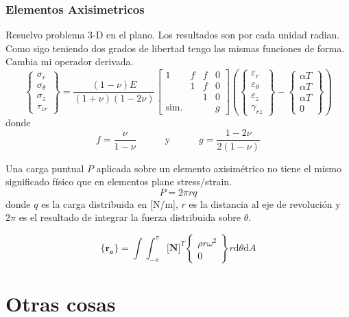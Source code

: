 \documentclass[11pt, a4paper,titlepage]{article}
\newcommand{\unspace}{\!\!\!\!\!\!\!\!\!\!\!\!\!\!\!\!\!\!\!\!}
\newcommand{\di}{\textrm{d}}
\newcommand{\Mme}[1]{\boldsymbol{[}\mathbf{#1} \boldsymbol{]}}
\newcommand{\Cme}[1]{\boldsymbol{\{ }\mathbf{#1} \boldsymbol{\}} }
\newcommand{\MN}{\Mme{N}}
\newcommand{\radial}{r}
\newcommand{\eff}{f}
\let\oldpart\part
\renewcommand{\part}[1]{\clearpage \oldpart{#1}}
\begin{document}
\section{Elementos Axisimetricos}
Resuelvo problema 3-D en el plano. Los resultados son por cada unidad radian. Como sigo teniendo dos grados de libertad tengo las mismas funciones de forma. Cambia mi operador derivada.
\[
\begin{Bmatrix}
    \sigma_\radial \\
    \sigma_\theta \\
    \sigma_z \\
    \tau_{z\radial}
\end{Bmatrix}
= \frac{(1-\nu)E}{(1+\nu)(1-2\nu)}
\begin{bmatrix}
   1 & \eff & \eff & 0 \\
    & 1 & \eff & 0 \\
    & & 1 & 0 \\
    \textrm{sim.}\unspace& & & g 
\end{bmatrix}
\left(
\begin{Bmatrix}
\varepsilon_\radial \\
\varepsilon_\theta \\
\varepsilon_z \\
\gamma_{\radial z}
\end{Bmatrix}
-
\begin{Bmatrix}
\alpha T\\
\alpha T \\
\alpha T \\
0
\end{Bmatrix}
\right)
\]
donde 
\[
f=\frac{\nu}{1-\nu}\qquad \quad \textrm{y}\quad \qquad g=\frac{1-2\nu}{2(1-\nu)}
\]

Una carga puntual $P$ aplicada sobre un elemento axisimétrico no tiene el mismo significado físico que en elementos plane stress/strain. 
\[
P=2\pi rq
\]
donde $q$ es la carga distribuida en [N/m], $r$ es la distancia al eje de revolución y $2 \pi$ es el resultado de integrar la fuerza distribuida sobre $\theta$. 

\[
\Cme{r_e} = \int\int_{-\pi}^{\pi} \MN^T \begin{Bmatrix}
    \rho r \omega ^2 \\
    0
\end{Bmatrix} r \di \theta \di A
\]
\part{Otras cosas}
\end{document}
